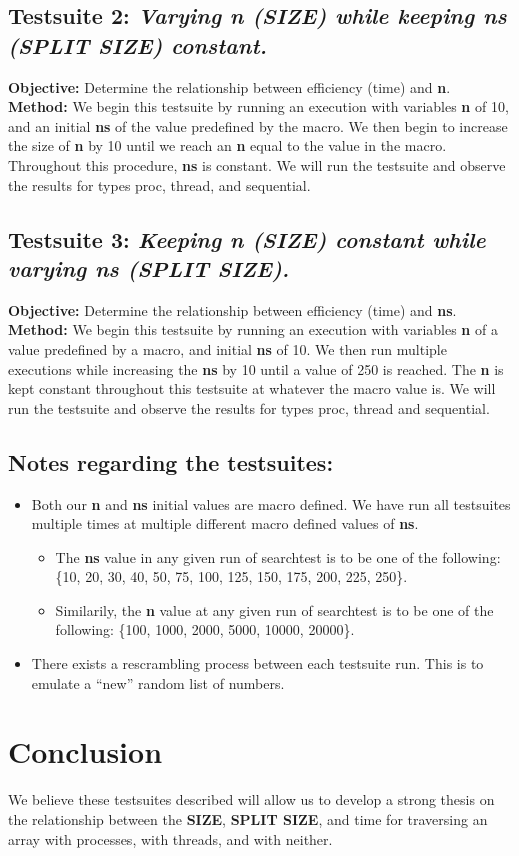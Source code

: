 \documentclass{article}
\begin{document}
        \subsection{Testsuite 2: \textit{Varying n (SIZE) while keeping ns (SPLIT SIZE) constant.}}
            \textbf{Objective:} Determine the relationship between efficiency (time) and \textbf{n}. \newline
            \textbf{Method:} We begin this testsuite by running an execution with variables \textbf{n} of 10, and an initial \textbf{ns} of the value predefined by the macro. We then begin to increase the size of \textbf{n} by 10 until we reach an \textbf{n} equal to the value in the macro. Throughout this procedure, \textbf{ns} is constant. \newline
            We will run the testsuite and observe the results for types proc, thread, and sequential.
        \subsection{Testsuite 3: \textit{Keeping n (SIZE) constant while varying ns (SPLIT SIZE).}}
            \textbf{Objective:} Determine the relationship between efficiency (time) and \textbf{ns}. \newline
            \textbf{Method:} We begin this testsuite by running an execution with variables \textbf{n} of a value predefined by a macro, and initial \textbf{ns} of 10. We then run multiple executions while increasing the \textbf{ns} by 10 until a value of 250 is reached. The \textbf{n} is kept constant throughout this testsuite at whatever the macro value is. \newline
            We will run the testsuite and observe the results for types proc, thread and sequential.
        \subsection{Notes regarding the testsuites:}
            \begin{itemize}
                \item Both our \textbf{n} and \textbf{ns} initial values are macro defined. We have run all testsuites multiple times at multiple different macro defined values of \textbf{ns}. 
                    \begin{itemize}
                        \item The \textbf{ns} value in any given run of searchtest is to be one of the following: \{10, 20, 30, 40, 50, 75, 100, 125, 150, 175, 200, 225, 250\}.
                        \item  Similarily, the \textbf{n} value at any given run of searchtest is to be one of the following: \{100, 1000, 2000, 5000, 10000, 20000\}.
                    \end{itemize}
                \item There exists a rescrambling process between each testsuite run. This is to emulate a ``new'' random list of numbers.
            \end{itemize}
    \section{Conclusion}
        We believe these testsuites described will allow us to develop a strong thesis on the relationship between the \textbf{SIZE}, \textbf{SPLIT SIZE}, and time for traversing an array with processes, with threads, and with neither.
\end{document}
